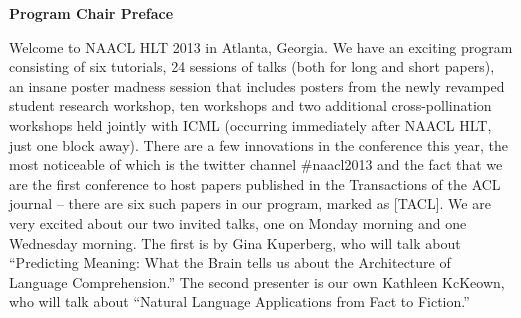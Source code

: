 







%

\begin{center}
  {\Large \bf Program Chair Preface} 
\end{center}

\vspace*{0.5cm}


Welcome to NAACL HLT 2013 in Atlanta, Georgia. We have an exciting program consisting of six tutorials, 24 sessions of talks (both for long and short papers), an insane poster madness session that includes posters from the newly revamped student research workshop, ten workshops and two additional cross-pollination workshops held jointly with ICML (occurring immediately after NAACL HLT, just one block away). There are a few innovations in the conference this year, the most noticeable of which is the twitter channel \#naacl2013 and the fact that we are the first conference to host papers published in the Transactions of the ACL journal -- there are six such papers in our program, marked as [TACL].
We are very excited about our two invited talks, one on Monday morning and one Wednesday morning. The first is by Gina Kuperberg, who will talk about ``Predicting Meaning: What the Brain tells us about the Architecture of Language Comprehension.'' The second presenter is our own Kathleen KcKeown, who will talk about ``Natural Language Applications from Fact to Fiction.''

